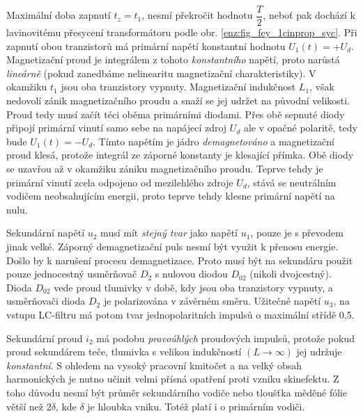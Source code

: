       Maximální doba zapnutí \(t_z=t_1\), nesmí překročit hodnotu \(\dfrac{T}{2}\), neboť pak 
      dochází k lavinovitému přesycení transformátoru podle obr. \ref{enz:fig_fey_1cinprop_syc}. Při 
      zapnutí obou tranzistorů má primární napětí konstantní hodnotu \(U_1(t)=+U_d\). Magnetizační 
      proud je integrálem z tohoto \emph{konstantního} napětí, proto narůstá \emph{lineárně} (pokud 
      zanedbáme nelinearitu magnetizační charakteristiky). V okamžiku \(t_1\) jsou oba tranzistory 
      vypnuty. Magnetizační indukčnost \(L_1\), však nedovolí zánik magnetizačního proudu a snaží se 
      jej udržet na původní velikosti. Proud tedy musí začít téci oběma primárními diodami. Přes obě 
      sepnuté diody připojí primární vinutí samo sebe na napájecí zdroj \(U_d\) ale v opačné 
      polaritě, tedy bude \(U_1(t)=-U_d\). Tímto napětím je jádro \emph{demagnetováno} a 
      magnetizační proud klesá, protože integrál ze záporné konstanty je klesající přímka. Obě diody 
      se uzavřou až v okamžiku zániku magnetizačního proudu. Teprve tehdy je primární vinutí zcela 
      odpojeno od mezilehlého zdroje \(U_d\), stává se neutrálním vodičem neobsahujícím energii, 
      proto teprve tehdy klesne primární napětí na nulu.
      
      Sekundární napětí \(u_2\) musí mít \emph{stejný tvar} jako napětí \(u_1\), pouze je s převodem 
      jinak velké. Záporný demagnetizační puls nesmí být využit k přenosu energie. Došlo by k 
      narušení procesu demagnetizace. Proto musí být na sekundáru použit pouze jednocestný 
      usměrňovač \(D_2\) s nulovou diodou \(D_{02}\) (nikoli dvojcestný). Dioda \(D_{02}\) vede 
      proud tlumivky v době, kdy jsou oba tranzistory vypnuty, a usměrňovači dioda \(D_2\) je 
      polarizována v závěrném směru. Užitečné napětí \(u_3\), na vstupu LC-filtru má potom tvar 
      jednopolaritních impulsů o maximální střídě 0,5.
      
      Sekundární proud \(i_2\) má podobu \emph{pravoúhlých} proudových impulsů, protože pokud proud 
      sekundárem teče, tlumivka s velikou indukčností \((L\rightarrow\infty)\) jej udržuje 
      \emph{konstantní}. S ohledem na vysoký pracovní kmitočet a na velký obsah harmonických je 
      nutno učinit velmi přísná opatření proti vzniku skinefektu. Z toho důvodu nesmí být průměr 
      sekundárního vodiče nebo tloušťka měděné fólie větší než \(2\delta\), kde \(\delta\) je 
      hloubka vniku. Totéž platí i o primárním vodiči.
      
